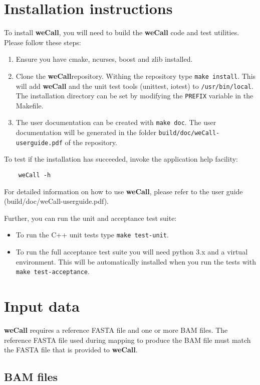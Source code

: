 \documentclass{article}
\newcommand{\wecallproduct}{\textbf{weCall}}
\begin{document}
\section{Installation instructions}

To install {\wecallproduct}, you will need to build the {\wecallproduct} code and test utilities. Please follow these steps:
\begin{enumerate}
    \item Ensure you have cmake, ncurses, boost and zlib installed.
    \item Clone the \wecallproduct repository. Withing the repository type \verb|make install|. This will add {\wecallproduct} and the unit test tools (unittest, iotest) to \verb|/usr/bin/local|. The installation directory can be set by modifying the \verb|PREFIX| variable in the Makefile.
    \item The user documentation can be created with \verb|make doc|. The user documentation will be generated in the folder \verb|build/doc/weCall-userguide.pdf| of the repository.
\end{enumerate}

To test if the installation has succeeded, invoke the application help facility:
\begin{lstlisting}
    weCall -h
\end{lstlisting}
For detailed information on how to use \wecallproduct, please refer to the user guide (build/doc/weCall-userguide.pdf).

Further, you can run the unit and acceptance test suite:
\begin{itemize}
    \item To run the C++ unit tests type \verb|make test-unit|.
    \item To run the full acceptance test suite you will need python 3.x and a virtual environment. This will be automatically installed when you run the tests with \verb|make test-acceptance|.
\end{itemize}

\section{Input data}
{\wecallproduct} requires a reference FASTA file and one or more BAM files. The reference FASTA file used during mapping to produce the BAM file must match the
FASTA file that is provided to \wecallproduct.


\subsection{BAM files}
\end{document}
